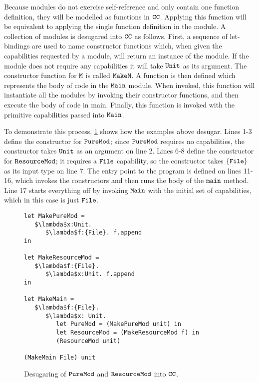 Because modules do not exercise self-reference and only contain one function definition, they will be modelled as functions in $\mathtt{CC}$. Applying this function will be equivalent to applying the single function definition in the module. A collection of modules is desugared into $\mathtt{CC}$ as follows. First, a sequence of let-bindings are used to name constructor functions which, when given the capabilities requested by a module, will return an instance of the module. If the module does not require any capabilities it will take $\mathtt{Unit}$ as its argument. The constructor function for $\mathtt{M}$ is called $\mathtt{MakeM}$. A function is then defined which represents the body of code in the $\mathtt{Main}$ module. When invoked, this function will instantiate all the modules by invoking their constructor functions, and then execute the body of code in main. Finally, this function is invoked with the primitive capabilities passed into $\mathtt{Main}$.

To demonstrate this process, \ref{fig:wyv_tutorial_desugaring} shows how the examples above desugar. Lines 1-3 define the constructor for $\mathtt{PureMod}$; since $\mathtt{PureMod}$ requires no capabilities, the constructor takes $\mathtt{Unit}$ as an argument on line 2. Lines 6-8 define the constructor for $\mathtt{ResourceMod}$; it requires a $\mathtt{File}$ capability, so the constructor takes $\mathtt{\{File\}}$ as its input type on line 7. The entry point to the program is defined on lines 11-16, which invokes the constructors and then runs the body of the $\mathtt{main}$ method. Line 17 starts everything off by invoking $\mathtt{Main}$ with the initial set of capabilities, which in this case is just $\mathtt{File}$.

\begin{figure}[h]

\begin{lstlisting}
let MakePureMod =
   $\lambda$x:Unit.
      $\lambda$f:{File}. f.append
in

let MakeResourceMod =
   $\lambda$f:{File}.
      $\lambda$x:Unit. f.append
in

let MakeMain =
   $\lambda$f:{File}.
      $\lambda$x: Unit.
         let PureMod = (MakePureMod unit) in
         let ResourceMod = (MakeResourceMod f) in
         (ResourceMod unit)

(MakeMain File) unit
\end{lstlisting}

\caption{Desugaring of $\mathtt{PureMod}$ and $\mathtt{ResourceMod}$ into $\mathtt{CC}$.}
\label{fig:wyv_tutorial_desugaring}
\end{figure}


